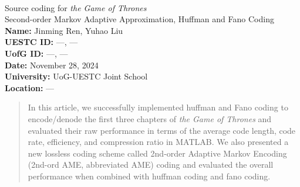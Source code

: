\documentclass[12pt,twoside]{article}
\begin{document}
\begin{center}
    \textbf{ } \\
    \vspace{14em}
    {\huge \textsf{Source coding for \textit{the Game of Thrones}}} \\
    \vspace{1.5em}
    {\large \textsf{Second-order Markov Adaptive Approximation, Huffman and Fano Coding}} \\
    \vspace{1em}
    \vspace{1.5cm}
    \textbf{Name:} Jinming Ren, Yuhao Liu \\
    \vspace{0.5em}
    \textbf{UESTC ID:} ---, --- \\
    \vspace{0.5em}
    \textbf{UofG ID:} ---, --- \\
    \vspace{0.5em}
    \textbf{Date:} November 28, 2024 \\
    \vspace{0.5em}
    \vspace{1cm}
    \textbf{University:} UoG-UESTC Joint School \\
    \vspace{0.5em}
    \textbf{Location:} --- \\
    \vspace{2cm}
\end{center}

\newpage
\tableofcontents

\newpage
\listoffigures
\listoftables
\newpage

\begin{abstract}
    In this article, we successfully implemented huffman and Fano coding to encode/denode the first three chapters of \textit{the Game of Thrones} and evaluated their raw performance in terms of the average code length, code rate, efficiency, and compression ratio in MATLAB. We also presented a new lossless coding scheme called 2nd-order Adaptive Markov Encoding (2nd-ord AME, abbreviated AME) coding and evaluated the overall performance when combined with huffman coding and fano coding.
\end{abstract}
\end{document}
